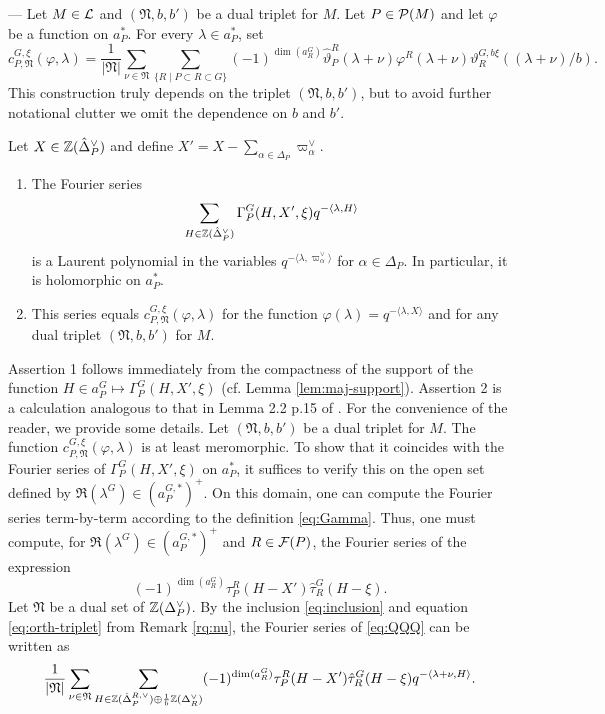 \begin{paragr} --- Let $M\in \mathcal{L}$ and $(\mathfrak{N},b,b')$ be a dual triplet for $M$. Let $P\in \mathcal{P}(M)$ and let $\varphi$ be a function on $a_{P}^*$. For every $\lambda\in a_{P}^*$, set 
\begin{equation}
  \label{eq:cPQxi}
  c_{P,\mathfrak{N}}^{G,\xi}(\varphi,\lambda)=\frac{1}{|\mathfrak{N}|}\sum_{\nu\in \mathfrak{N}} \sum_{\{R\mid P\subset R\subset G \}} (-1)^{\dim(a_R^G)} \hat{\vartheta}_P^R(\lambda+\nu) \varphi^R(\lambda+\nu) \vartheta_R^{G,b \xi}((\lambda+\nu)/b).
\end{equation}
This construction truly depends on the triplet $(\mathfrak{N},b,b')$, but to avoid further notational clutter we omit the dependence on $b$ and $b'$.

\begin{lemme}\label{lem:FourierGamma}
Let $X \in \mathbb{Z}(\hat{\Delta}_P^\vee)$ and define $X'=X-\sum_{\alpha \in \Delta_P} \varpi_\alpha^\vee$.
\begin{enumerate}
\item The Fourier series 
$$\sum_{H\in \mathbb{Z}(\hat{\Delta}_P^\vee)} \Gamma_P^G(H,X',\xi) q^{-\langle \lambda , H\rangle}$$
is a Laurent polynomial in the variables $q^{-\langle \lambda, \varpi_{\alpha}^\vee\rangle}$ for $\alpha\in \Delta_P$. In particular, it is holomorphic on $a_P^*$.
\item This series equals $c_{P,\mathfrak{N}}^{G,\xi}(\varphi,\lambda)$ for the function $\varphi(\lambda)=q^{-\langle \lambda , X\rangle}$ and for any dual triplet $(\mathfrak{N},b,b')$ for $M$. 
\end{enumerate}
\end{lemme}

\begin{preuve}
Assertion 1 follows immediately from the compactness of the support of the function $H\in a_P^G\mapsto  \Gamma_P^G(H,X',\xi)$ (cf. Lemma \ref{lem:maj-support}). Assertion 2 is a calculation analogous to that in Lemma 2.2 p.15 of \cite{trace_inv}. For the convenience of the reader, we provide some details. Let $(\mathfrak{N},b,b')$ be a dual triplet for $M$. The function $c_{P,\mathfrak{N}}^{G,\xi}(\varphi,\lambda)$ is at least meromorphic. To show that it coincides with the Fourier series of $\Gamma_P^G(H,X',\xi)$ on $a_P^*$, it suffices to verify this on the open set defined by $\Re(\lambda^G)\in (a_P^{G,*})^+$. On this domain, one can compute the Fourier series term-by-term according to the definition \eqref{eq:Gamma}. Thus, one must compute, for $\Re(\lambda^G)\in (a_P^{G,*})^+$ and $R\in \mathcal{F}(P)$, the Fourier series of the expression
\begin{equation}
  \label{eq:QQQ}
  (-1)^{\dim(a_R^G)} \tau_P^R(H-X')\hat{\tau}_R^G(H-\xi).
\end{equation}
Let $\mathfrak{N}$ be a dual set of $\mathbb{Z}(\Delta_{P}^\vee)$. By the inclusion \eqref{eq:inclusion} and equation \eqref{eq:orth-triplet} from Remark \ref{rq:nu}, the Fourier series of \eqref{eq:QQQ} can be written as
$$\frac{1}{|\mathfrak{N}|}\sum_{\nu\in \mathfrak{N}} \sum_{H\in \mathbb{Z}(\hat{\Delta}_P^{R,\vee})\oplus \frac{1}{b}\mathbb{Z}(\Delta_R^\vee)}  (-1)^{\dim(a_R^G)} \tau_P^R(H-X')\hat{\tau}_R^G(H-\xi) q^{-\langle \lambda+\nu,H\rangle}.$$


\end{preuve}
\end{paragr}
